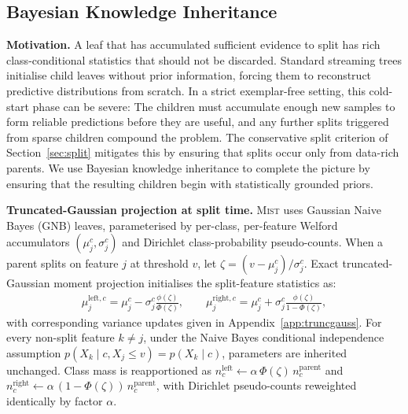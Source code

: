 \documentclass{article}
\newcommand{\mist}{\textsc{Mist}}
\begin{document}
\subsection{Bayesian Knowledge Inheritance}
\label{sec:inheritance}
\noindent
\textbf{Motivation.}
A leaf that has accumulated sufficient evidence to split has rich
class-conditional statistics that should not be discarded. Standard streaming
trees initialise child leaves without prior information, forcing them to reconstruct predictive
distributions from scratch. In a strict exemplar-free setting, this
cold-start phase can be severe: The children must accumulate enough new
samples to form reliable predictions before they are useful, and any further
splits triggered from sparse children compound the problem. The conservative
split criterion of Section~\ref{sec:split} mitigates this by ensuring that
splits occur only from data-rich parents. We use Bayesian knowledge inheritance
to complete the picture by ensuring that the resulting children begin with
statistically grounded priors.

\noindent
\textbf{Truncated-Gaussian projection at split time.}
\mist{} uses Gaussian Naive Bayes (GNB) leaves, parameterised by
per-class, per-feature Welford accumulators $(\mu_j^c, \sigma_j^c)$ and
Dirichlet class-probability pseudo-counts. When a parent splits on
feature $j$ at threshold $v$, let $\zeta = (v - \mu_j^c)/\sigma_j^c$.
Exact truncated-Gaussian moment projection initialises the split-feature
statistics as:
\begin{align}
\label{eq:mu_left_right}
  \mu_j^{\mathrm{left},c}  = \mu_j^c
    - \sigma_j^c\frac{\phi(\zeta)}{\Phi(\zeta)}, \qquad
  \mu_j^{\mathrm{right},c} = \mu_j^c
    + \sigma_j^c\frac{\phi(\zeta)}{1 - \Phi(\zeta)},
\end{align}
with corresponding variance updates given in
Appendix~\ref{app:truncgauss}. For every non-split feature $k \neq j$,
under the Naive Bayes conditional independence assumption
$p(X_k \mid c, X_j \leq v) = p(X_k \mid c)$, parameters are inherited
unchanged. 
Class mass is reapportioned as
$n_c^{\mathrm{left}} \leftarrow \alpha\,\Phi(\zeta)\,n_c^{\mathrm{parent}}$
and
$n_c^{\mathrm{right}} \leftarrow \alpha\,(1{-}\Phi(\zeta))\,n_c^{\mathrm{parent}}$,
with Dirichlet pseudo-counts reweighted identically by factor $\alpha$.
 
\end{document}
